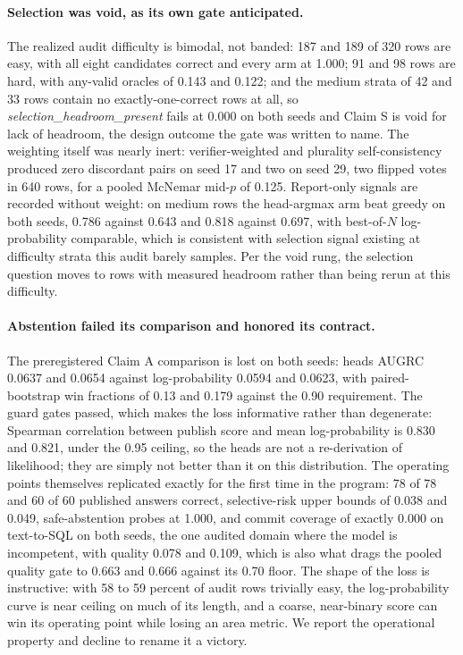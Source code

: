 \documentclass[10pt,a4paper]{article}
\begin{document}
\paragraph{Selection was void, as its own gate anticipated.}
The realized audit difficulty is bimodal, not banded: 187 and 189 of 320 rows
are easy, with all eight candidates correct and every arm at 1.000; 91 and 98
rows are hard, with any-valid oracles of 0.143 and 0.122; and the medium
strata of 42 and 33 rows contain no exactly-one-correct rows at all, so
\emph{selection\_headroom\_present} fails at 0.000 on both seeds and Claim S
is void for lack of headroom, the design outcome the gate was written to
name. The weighting itself was nearly inert: verifier-weighted and plurality
self-consistency produced zero discordant pairs on seed 17 and two on seed
29, two flipped votes in 640 rows, for a pooled McNemar mid-$p$ of 0.125.
Report-only signals are recorded without weight: on medium rows the
head-argmax arm beat greedy on both seeds, 0.786 against 0.643 and 0.818
against 0.697, with best-of-$N$ log-probability comparable, which is
consistent with selection signal existing at difficulty strata this audit
barely samples. Per the void rung, the selection question moves to rows with
measured headroom rather than being rerun at this difficulty.

\paragraph{Abstention failed its comparison and honored its contract.}
The preregistered Claim A comparison is lost on both seeds: heads AUGRC
0.0637 and 0.0654 against log-probability 0.0594 and 0.0623, with
paired-bootstrap win fractions of 0.13 and 0.179 against the 0.90
requirement. The guard gates passed, which makes the loss informative rather
than degenerate: Spearman correlation between publish score and mean
log-probability is 0.830 and 0.821, under the 0.95 ceiling, so the heads are
not a re-derivation of likelihood; they are simply not better than it on this
distribution. The operating points themselves replicated exactly for the
first time in the program: 78 of 78 and 60 of 60 published answers correct,
selective-risk upper bounds of 0.038 and 0.049, safe-abstention probes at
1.000, and commit coverage of exactly 0.000 on text-to-SQL on both seeds, the
one audited domain where the model is incompetent, with quality 0.078 and
0.109, which is also what drags the pooled quality gate to 0.663 and 0.666
against its 0.70 floor. The shape of the loss is instructive: with 58 to 59
percent of audit rows trivially easy, the log-probability curve is near
ceiling on much of its length, and a coarse, near-binary score can win its
operating point while losing an area metric. We report the operational
property and decline to rename it a victory.
\end{document}
